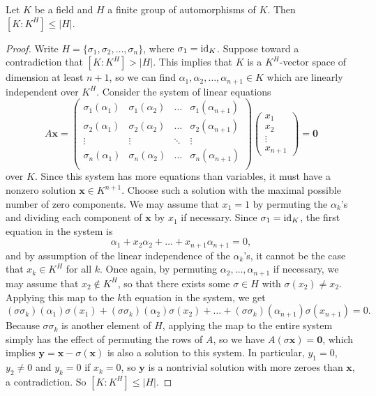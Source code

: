 \begin{lemma}[Artin]
\label{lem_artin}
    Let $K$ be a field and $H$ a finite group of automorphisms of $K$. Then $[K : K^H] \leq |H|$.
\end{lemma}

\begin{proof}
    Write $H = \{\sigma_1, \sigma_2, \ldots, \sigma_n\}$, where $\sigma_1 = \operatorname{id}_K$. Suppose toward a contradiction that $[K : K^H] > |H|$. This implies that $K$ is a $K^H$-vector space of dimension at least $n + 1$, so we can find $\alpha_1, \alpha_2, \ldots, \alpha_{n + 1} \in K$ which are linearly independent over $K^H$. Consider the system of linear equations
    \[
        A \bm{x} =
        \begin{pmatrix}
            \sigma_1(\alpha_1) & \sigma_1(\alpha_2) & \ldots & \sigma_1(\alpha_{n + 1}) \\
            \sigma_2(\alpha_1) & \sigma_2(\alpha_2) & \ldots & \sigma_2(\alpha_{n + 1}) \\
            \vdots & \vdots & \ddots & \vdots \\
            \sigma_n(\alpha_1) & \sigma_n(\alpha_2) & \ldots & \sigma_n(\alpha_{n + 1}) \\
        \end{pmatrix}
        \begin{pmatrix}
            x_1 \\ x_2 \\ \vdots \\ x_{n + 1}
        \end{pmatrix}
        = \bm{0}
    \]
    over $K$. Since this system has more equations than variables, it must have a nonzero solution $\bm{x} \in K^{n + 1}$. Choose such a solution with the maximal possible number of zero components. We may assume that $x_1 = 1$ by permuting the $\alpha_k$'s and dividing each component of $\bm{x}$ by $x_1$ if necessary. Since $\sigma_1 = \operatorname{id}_K$, the first equation in the system is
    \[
        \alpha_1 + x_2 \alpha_2 + \ldots + x_{n + 1} \alpha_{n + 1} = 0,
    \]
    and by assumption of the linear independence of the $\alpha_k$'s, it cannot be the case that $x_k \in K^H$ for all $k$. Once again, by permuting $\alpha_2, \ldots, \alpha_{n + 1}$ if necessary, we may assume that $x_2 \not\in K^H$, so that there exists some $\sigma \in H$ with $\sigma(x_2) \neq x_2$. Applying this map to the $k$th equation in the system, we get
    \[
        (\sigma \sigma_k)(\alpha_1) \sigma(x_1) + (\sigma \sigma_k)(\alpha_2) \sigma(x_2) + \ldots + (\sigma \sigma_k)(\alpha_{n + 1}) \sigma(x_{n + 1}) = 0.
    \]
    Because $\sigma \sigma_k$ is another element of $H$, applying the map to the entire system simply has the effect of permuting the rows of $A$, so we have $A(\sigma \bm{x}) = \bm{0}$, which implies $\bm{y} = \bm{x} - \sigma(\bm{x})$ is also a solution to this system. In particular, $y_1 = 0$, $y_2 \neq 0$ and $y_k = 0$ if $x_k = 0$, so $\bm{y}$ is a nontrivial solution with more zeroes than $\bm{x}$, a contradiction. So $[K : K^H] \leq |H|$.
\end{proof}

